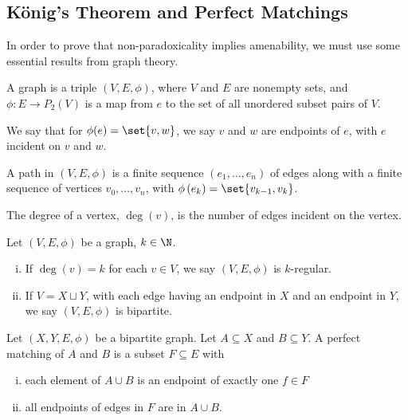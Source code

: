 \documentclass[10pt]{mypackage}
\begin{document}
\subsection{König's Theorem and Perfect Matchings}%
In order to prove that non-paradoxicality implies amenability, we must use some essential results from graph theory.
\begin{definition}
  A graph is a triple $\left(V,E,\phi\right)$, where $V$ and $E$ are nonempty sets, and $\phi: E\rightarrow P_{2}(V)$ is a map from $e$ to the set of all unordered subset pairs of $V$.\newline

  We say that for $\phi(e) = \set{v,w}$, we say $v$ and $w$ are endpoints of $e$, with $e$ incident on $v$ and $w$.\newline

  A path in $(V,E,\phi)$ is a finite sequence $\left(e_1,\dots,e_n\right)$ of edges along with a finite sequence of vertices $v_0,\dots,v_n$, with $\phi\left(e_k\right) = \set{v_{k-1},v_k}$.\newline

  The degree of a vertex, $\deg(v)$, is the number of edges incident on the vertex.
\end{definition}
\begin{definition}
  Let $(V,E,\phi)$ be a graph, $k\in \N$.
  \begin{enumerate}[(i)]
    \item If $\deg(v) = k$ for each $v\in V$, we say $(V,E,\phi)$ is $k$-regular.
    \item If $V = X\sqcup Y$, with each edge having an endpoint in $X$ and an endpoint in $Y$, we say $(V,E,\phi)$ is bipartite.
  \end{enumerate}
\end{definition}
\begin{definition}
Let $(X,Y,E,\phi)$ be a bipartite graph. Let $A\subseteq X$ and $B\subseteq Y$. A perfect matching of $A$ and $B$ is a subset $F\subseteq E$ with
\begin{enumerate}[(i)]
  \item each element of $A\cup B$ is an endpoint of exactly one $f\in F$
  \item all endpoints of edges in $F$ are in $A\cup B$.
\end{enumerate}
\end{definition}
\end{document}
